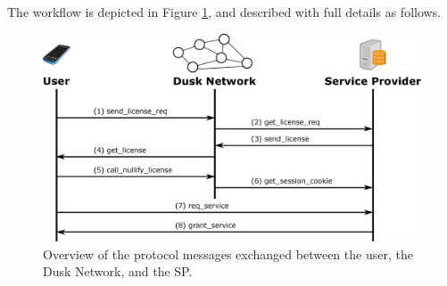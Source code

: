 
The workflow is depicted in Figure \ref{fig:protocol}, and described with full details as follows.

\begin{figure}[h]
	\centering
		\includegraphics[width=390pt,draft=false]{images/protocol.eps}
	\caption{Overview of the protocol messages exchanged between the user, the Dusk Network, and the SP.}
	\label{fig:protocol}
\end{figure}

